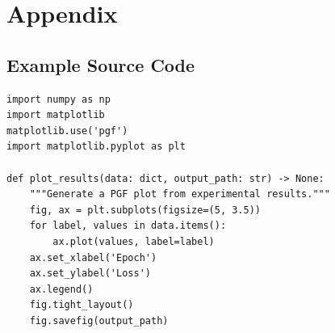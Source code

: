 \chapter*{Appendix}\label{appendix}
\renewcommand{\thesection}{\Alph{section}}


%

\section{Example Source Code}\label{sec:example_code}

\begin{listing}[ht]
\begin{verbatim}
import numpy as np
import matplotlib
matplotlib.use('pgf')
import matplotlib.pyplot as plt

def plot_results(data: dict, output_path: str) -> None:
    """Generate a PGF plot from experimental results."""
    fig, ax = plt.subplots(figsize=(5, 3.5))
    for label, values in data.items():
        ax.plot(values, label=label)
    ax.set_xlabel('Epoch')
    ax.set_ylabel('Loss')
    ax.legend()
    fig.tight_layout()
    fig.savefig(output_path)
\end{verbatim}
\caption{Example Python function that exports a matplotlib figure as PGF.}
\label{lst:example_python}
\end{listing}

